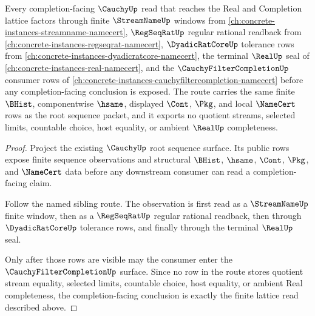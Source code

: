 \begin{theorem}
\label{thm:cauchy-orphan-real-completion-lattice-repair}
Every completion-facing $\CauchyUp$ read that reaches the Real and Completion lattice factors through finite $\StreamNameUp$ windows from \autoref{ch:concrete-instances-streamname-namecert}, $\RegSeqRatUp$ regular rational readback from \autoref{ch:concrete-instances-regseqrat-namecert}, $\DyadicRatCoreUp$ tolerance rows from \autoref{ch:concrete-instances-dyadicratcore-namecert}, the terminal $\RealUp$ seal of \autoref{ch:concrete-instances-real-namecert}, and the $\CauchyFilterCompletionUp$ consumer rows of \autoref{ch:concrete-instances-cauchyfiltercompletion-namecert} before any completion-facing conclusion is exposed. The route carries the same finite $\BHist$, componentwise $\hsame$, displayed $\Cont$, $\Pkg$, and local $\NameCert$ rows as the root sequence packet, and it exports no quotient streams, selected limits, countable choice, host equality, or ambient $\RealUp$ completeness.
\end{theorem}
\begin{proof}
Project the existing $\CauchyUp$ root sequence surface. Its public rows expose finite sequence observations and structural $\BHist$, $\hsame$, $\Cont$, $\Pkg$, and $\NameCert$ data before any downstream consumer can read a completion-facing claim.

Follow the named sibling route. The observation is first read as a $\StreamNameUp$ finite window, then as a $\RegSeqRatUp$ regular rational readback, then through $\DyadicRatCoreUp$ tolerance rows, and finally through the terminal $\RealUp$ seal.

Only after those rows are visible may the consumer enter the $\CauchyFilterCompletionUp$ surface. Since no row in the route stores quotient stream equality, selected limits, countable choice, host equality, or ambient Real completeness, the completion-facing conclusion is exactly the finite lattice read described above.
\end{proof}
